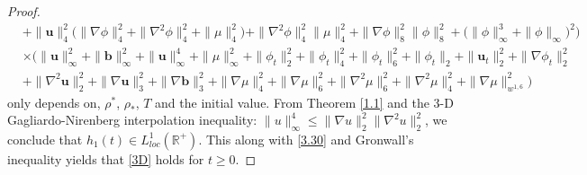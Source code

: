 \documentclass[11pt]{article}
\numberwithin{equation}{section}
\begin{document}
\begin{proof}
\begin{align*}
&+ \|\mathbf{u}\|_4^2 \big( \|\nabla \phi\|_4^2 + \|\nabla^2 \phi\|_4^2 + \|\mu\|_4^2 \big)
+ \|\nabla^2 \phi\|_4^2 \|\mu\|_4^2 + \|\nabla \phi\|_8^2 \|\phi\|_8^2
+ \big( \|\phi\|_\infty^3 + \|\phi\|_\infty\big)^2 \Bigr)\\
&\times\Big( \|\mathbf{u}\|_{\infty}^2 +\|\mathbf{b}\|_{\infty}^2 + \|\mathbf{u}\|_{\infty}^4 + \|\mu\|_{\infty}^2 + \|\phi_t\|_2^2 + \| \phi_t\|_4^2 + \| \phi_t\|_6^2 + \|\phi_t\|_2 + \|\mathbf{u}_t\|_2^2 + \|\nabla \phi_t\|_2^2 \\
&+  \|\nabla^2 \mathbf{u}\|_2^2 + \|\nabla \mathbf{u}\|_3^2 +\|\nabla \mathbf{b}\|_3^2 + \|\nabla \mu\|_4^2 + \|\nabla \mu\|_6^2 + \|\nabla^2 \mu\|_6^2 + \|\nabla^2 \mu\|_4^2 + \|\nabla \mu\|_{w^{1,6}}^2 \Big)
\end{align*}
only depends on, \( \rho^* \), \( \rho_* \), $T$ and the initial value.
From  Theorem \ref{1.1} and the  3-D Gagliardo-Nirenberg interpolation inequality: \( \| u \|_{\infty}^4 \leq \|\nabla u \|_2^2 \| \nabla^2 u \|_2^2 \), we conclude that $ h_1(t)\in L^1_{loc}(\mathbb{R}^+) $. This along with \eqref{3.30} and Gronwall's inequality yields that \eqref{3D}  holds for \( t \geq 0 \).
\end{proof}
\end{document}
